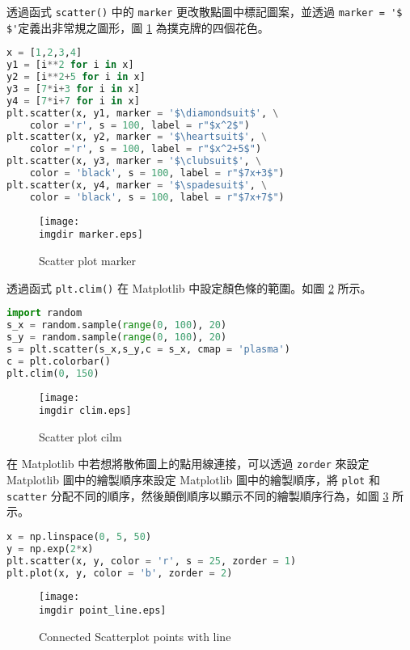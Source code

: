 透過函式 \verb|scatter()| 中的 \verb|marker| 更改散點圖中標記圖案，並透過 \verb|marker = '$ $'|定義出非常規之圖形，圖 \ref{fig:marker} 為撲克牌的四個花色。
\bigskip
\begin{lstlisting}[language = Python]
x = [1,2,3,4]
y1 = [i**2 for i in x]
y2 = [i**2+5 for i in x]
y3 = [7*i+3 for i in x]
y4 = [7*i+7 for i in x]
plt.scatter(x, y1, marker = '$\diamondsuit$', \
	color ='r', s = 100, label = r"$x^2$")
plt.scatter(x, y2, marker = '$\heartsuit$', \
	color ='r', s = 100, label = r"$x^2+5$")
plt.scatter(x, y3, marker = '$\clubsuit$', \
	color = 'black', s = 100, label = r"$7x+3$")
plt.scatter(x, y4, marker = '$\spadesuit$', \
	color = 'black', s = 100, label = r"$7x+7$")
\end{lstlisting}
\begin{figure}[h]
    \centering
        \texttt{[image: \\imgdir marker.eps]}
    \caption{Scatter plot marker}
    \label{fig:marker}
\end{figure}

透過函式 \verb|plt.clim()| 在 Matplotlib 中設定顏色條的範圍。如圖 \ref{fig:clim} 所示。
\bigskip
\begin{lstlisting}[language = Python]
import random
s_x = random.sample(range(0, 100), 20)
s_y = random.sample(range(0, 100), 20)
s = plt.scatter(s_x,s_y,c = s_x, cmap = 'plasma')
c = plt.colorbar()
plt.clim(0, 150) 
\end{lstlisting}
\begin{figure}[h]
    \centering
        \texttt{[image: \\imgdir clim.eps]}
    \caption{Scatter plot cilm}
    \label{fig:clim}
\end{figure}

在 Matplotlib 中若想將散佈圖上的點用線連接，可以透過 \verb|zorder| 來設定 Matplotlib 圖中的繪製順序來設定 Matplotlib 圖中的繪製順序，將 \verb|plot| 和 \verb|scatter| 分配不同的順序，然後顛倒順序以顯示不同的繪製順序行為，如圖 \ref{fig:point_line} 所示。
\bigskip
\begin{lstlisting}[language = Python]
x = np.linspace(0, 5, 50)
y = np.exp(2*x)
plt.scatter(x, y, color = 'r', s = 25, zorder = 1)
plt.plot(x, y, color = 'b', zorder = 2)
\end{lstlisting}
\begin{figure}[H]
    \centering
        \texttt{[image: \\imgdir point\_line.eps]}
    \caption{Connected Scatterplot points with line}
    \label{fig:point_line}
\end{figure}

